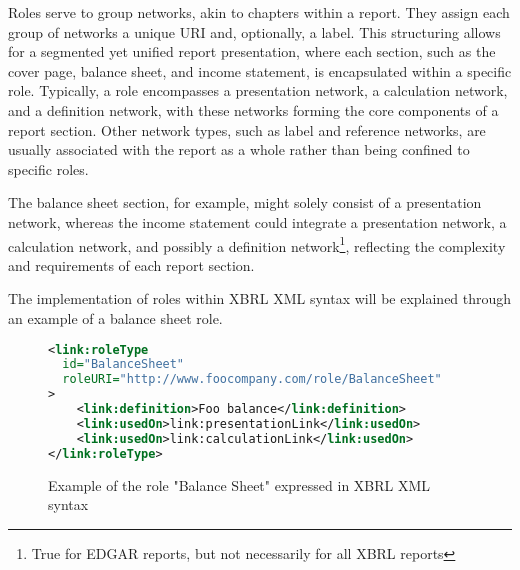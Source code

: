 Roles serve to group networks, akin to chapters within a report.
They assign each group of networks a unique URI and, optionally, a label.
This structuring allows for a segmented yet unified report presentation, where each section, such as the cover page, balance sheet, 
and income statement, is encapsulated within a specific role. 
Typically, a role encompasses a presentation network, a calculation network, and a definition network, 
with these networks forming the core components of a report section. 
Other network types, such as label and reference networks, are usually associated with the report as a whole rather than being confined to specific roles.

The balance sheet section, for example, might solely consist of a presentation network, whereas the income statement could integrate a presentation network, 
a calculation network, and possibly a definition network\footnote{True for EDGAR reports, but not necessarily for all XBRL reports}, reflecting the complexity and requirements of each report section.

The implementation of roles within XBRL XML syntax\cite{xbrl21_custom_roles} will be explained through an example of a balance sheet role.

\begin{figure}[H]
    \begin{lstlisting}[language=XML,basicstyle=\small\ttfamily]
<link:roleType 
  id="BalanceSheet" 
  roleURI="http://www.foocompany.com/role/BalanceSheet"
>
    <link:definition>Foo balance</link:definition>
    <link:usedOn>link:presentationLink</link:usedOn>
    <link:usedOn>link:calculationLink</link:usedOn>
</link:roleType>
\end{lstlisting}
\caption{Example of the role "Balance Sheet" expressed in XBRL XML syntax}
\label{fig:example_role_xbrl}
\end{figure}



